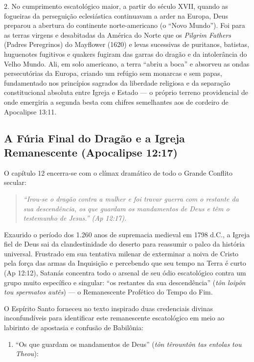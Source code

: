 2. No cumprimento escatológico maior, a partir do século XVII, quando as fogueiras da perseguição eclesiástica continuavam a arder na Europa, Deus preparou a abertura do continente norte-americano (o ``Novo Mundo''). Foi para as terras virgens e desabitadas da América do Norte que os \textit{Pilgrim Fathers} (Padres Peregrinos) do Mayflower (1620) e levas sucessivas de puritanos, batistas, huguenotes fugitivos e quakers fugiram das garras do dragão e da intolerância do Velho Mundo. Ali, em solo americano, a terra ``abriu a boca'' e absorveu as ondas persecutórias da Europa, criando um refúgio sem monarcas e sem papas, fundamentado nos princípios sagrados da liberdade religiosa e da separação constitucional absoluta entre Igreja e Estado — o próprio terreno providencial de onde emergiria a segunda besta com chifres semelhantes aos de cordeiro de Apocalipse 13:11.



\subsection{A Fúria Final do Dragão e a Igreja Remanescente (Apocalipse 12:17)}


O capítulo 12 encerra-se com o clímax dramático de todo o Grande Conflito secular:

\begin{quote}
\itshape ``Irou-se o dragão contra a mulher e foi travar guerra com o restante da sua descendência, os que guardam os mandamentos de Deus e têm o testemunho de Jesus.'' (Ap 12:17).
\end{quote}


Exaurido o período dos 1.260 anos de supremacia medieval em 1798 d.C., a Igreja fiel de Deus sai da clandestinidade do deserto para reassumir o palco da história universal. Frustrado em sua tentativa milenar de exterminar a noiva de Cristo pela força das armas da Inquisição e percebendo que seu tempo na Terra é curto (Ap 12:12), Satanás concentra todo o arsenal de seu ódio escatológico contra um grupo muito específico e singular: ``os restantes da sua descendência'' (\textit{tôn loipôn tou spermatos autês}) — o Remanescente Profético do Tempo do Fim.

O Espírito Santo forneceu no texto inspirado duas credenciais divinas inconfundíveis para identificar este remanescente escatológico em meio ao labirinto de apostasia e confusão de Babilônia:

\begin{enumerate}
  \item ``Os que guardam os mandamentos de Deus'' (\textit{tôn têrountôn tas entolas tou Theou}):
\end{enumerate}

